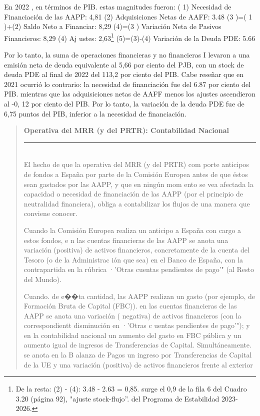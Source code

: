 \documentclass[10pt,a4paper]{article}
\newenvironment{specialblock}[1]{%
      \begin{quote} %
      \small %
      \noindent\textbf{#1}\\[-0.3em] %
      \rule{\linewidth}{0.4pt}\\[0.6em]}{
      \end{quote}}
\begin{document}
En 2022 , en términos de PIB. estas magnitudes fueron:
( 1) Necesidad de Financiación de las AAPP: 4,81
(2) Adquisiciones Netas de AAFF: 3.48
(3 )=( 1 )+(2) Saldo Neto a Financiar: 8,29
(4)=(3 ) Variación Neta de Pasivos Financieros: 8,29
(4) Aj ustes: 2,63\footnote{%
    De la resta: (2) - (4): 3.48 - 2.63 = 0,85. surge el 0,9 de la fila 6 del Cuadro 3.20 (página 92), "ajuste stock-flujo''. del Programa de Estabilidad 2023-2026.
}
(5)=(3)-(4) Variación de la Deuda PDE: 5.66

Por lo tanto, la suma de operaciones financieras y no financieras I levaron a una emisión neta de deuda equivalente al 5,66 por ciento del PJB, con un stock de deuda PDE al final de 2022 del 113,2 por ciento del PIB. Cabe reseñar que en 2021 ocurrió lo contrario: la necesidad de financiación fue del 6.87 por ciento del PIB. mientras que las adquisiciones netas de AAFF menos los ajustes ascendieron al -0, 12 por ciento del PIB. Por lo tanto, la variación de la deuda PDE fue de 6,75 puntos del PIB, inferior a la necesidad de financiación.

\begin{specialblock}{\textbf{Operativa del MRR (y del PRTR)}: Contabilidad Nacional}
    El hecho de que la operativa del MRR (y del PRTR) com porte anticipos de fondos a España por parte de la Comisión Europea antes de que éstos sean gastados por las AAPP, y que en ningún mom ento se vea afectada la capacidad o necesidad de financiación de las AAPP (por el principio de neutralidad financiera), obliga a contabilizar los flujos de una manera que conviene conocer.

    Cuando la Comisión Europea realiza un anticipo a España con cargo a estos fondos, e n las cuentas financieras de las AAPP se anota una variación (positiva) de activos financieros, concretamente de la cuenta del Tesoro (o de la Administrac ión que sea) en el Banco de España, con la contrapartida en la rúbrica ·'Otras cuentas pendientes de pago'" (al Resto del Mundo).
    
    Cuando. de e��ta cantidad, las AAPP realizan un gasto (por ejemplo, de Formación Bruta de Capital (FBC)). en las cuentas financieras de las AAPP se anota una variación ( negativa) de activos financieros (con la correspondientt disminución en ·'Otras c uentas pendientes de pago'"); y en la contabilidad nacional un aumento del gasto en FBC pública y un aumento igual de ingresos de Transferencias de Capital. Simultáneamente. se anota en la B alanza de Pagos un ingreso por Transferencias de Capital de la UE y una variación (positiva) de activos financieros frente al exterior
\end{specialblock}
\end{document}
